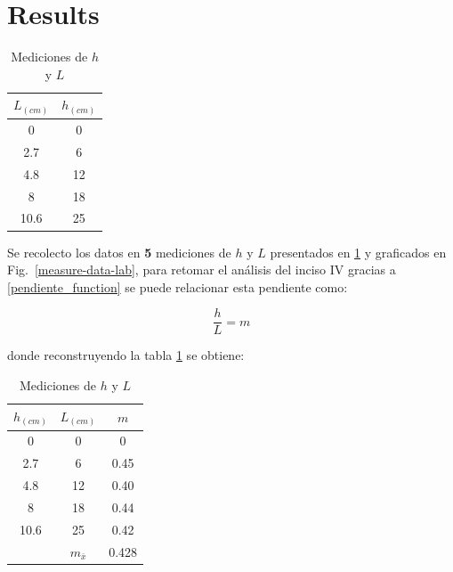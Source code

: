 \section{Results}

\begin{table}[htbp]
\caption{Mediciones de $h$ y $L$}
\begin{center}
\begin{tabular}{|c|c|}
\hline
\textbf{$L_{(cm)}$} & \textbf{$h_{(cm)}$} \\
[0.5ex]\hline\hline
0 & 0\\
\hline
2.7 & 6\\
\hline
4.8 & 12 \\
\hline
8 & 18 \\
\hline
10.6 & 25 \\
\hline
\end{tabular}
\label{tab1}
\end{center}
\end{table}

Se recolecto los datos en \textbf{5} mediciones de $h$ y $L$ presentados en \ref{tab1} y graficados en Fig.~\ref{measure-data-lab}, para retomar el análisis del inciso IV gracias a \ref{pendiente_function} se puede relacionar esta pendiente como:

\begin{equation}
    \label{pendiente-segunda}
    \frac{h}{L} = m
\end{equation}

donde reconstruyendo la tabla \ref{tab1} se obtiene:

\begin{table}[htbp]
\caption{Mediciones de $h$ y $L$}
\begin{center}
\begin{tabular}{|c|c|c|}
\hline
\textbf{$h_{(cm)}$} & \textbf{$L_{(cm)}$} & \textbf{$m$}\\
[0.5ex]\hline\hline
0 & 0 & 0\\
\hline
2.7 & 6 & 0.45\\
\hline
4.8 & 12 &  0.40\\
\hline
8 & 18  & 0.44\\
\hline
10.6 & 25 & 0.42\\
\hline
 & $m_{\bar{x}}$ & 0.428\\
\hline
\end{tabular}
\label{tab2}
\end{center}
\end{table}

